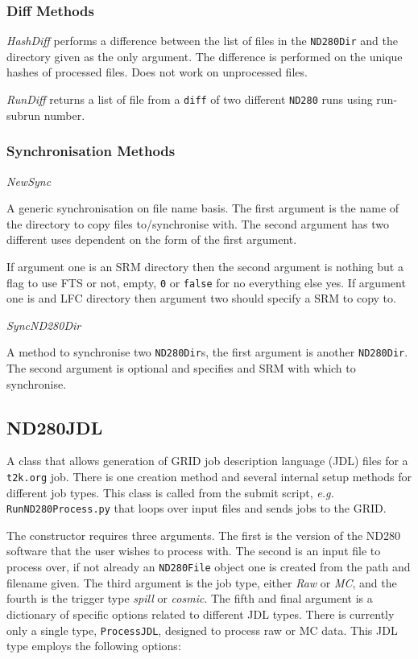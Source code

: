 \documentclass[11pt]{article}
\begin{document}
\subsubsection*{Diff Methods}
\textit{HashDiff} performs a difference between the list of files in
the \verb+ND280Dir+ and the directory given as the only argument. The
difference is performed on the unique hashes of processed files. Does
not work on unprocessed files. 

\textit{RunDiff} returns a list of file from a \verb+diff+ of two different
\verb+ND280+ runs using run-subrun number. 

\subsubsection*{Synchronisation Methods}

\textit{NewSync}

A generic synchronisation on file name basis. The first argument is
the name of the directory to copy files to/synchronise with. The second
argument has two different uses dependent on the form of the first
argument. 

If argument one is an SRM directory then the second argument
is nothing but a flag to use FTS or not, empty, \verb+0+ or
\verb+false+ for no everything else yes. If argument one is and LFC
directory then argument two should specify a SRM to copy to.

\textit{SyncND280Dir}

A method to synchronise two \verb+ND280Dir+s, the first argument is another
\verb+ND280Dir+. The second argument is optional and specifies and SRM with
which to synchronise. 

\subsection{ND280JDL}
A class that allows generation of GRID job description language (JDL)
files for a \verb+t2k.org+ job. There is one creation method and several
internal setup methods for different job types. This class is called
from the submit script, \textit{e.g.} \verb+RunND280Process.py+ that
loops over input files and sends jobs to the GRID.

The constructor requires three arguments. The first is the version of
the ND280 software that the user wishes to process with. The second is
an input file to process over, if not already an \verb+ND280File+ object one
is created from the path and filename given. 
The third argument is the job type, either \textit{Raw} or
\textit{MC}, and the fourth is the trigger type \textit{spill} or
\textit{cosmic}. The fifth and final argument is a dictionary of
specific options related to different JDL types. There is currently
only a single type, \verb+ProcessJDL+, designed to process raw or MC
data. This JDL type employs the following options:
\end{document}

